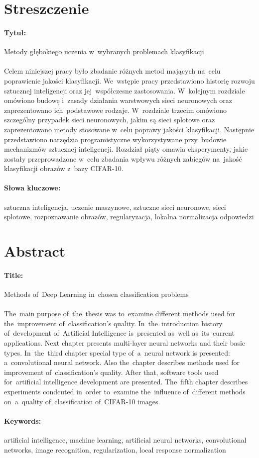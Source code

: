 \newpage
\thispagestyle{empty} %
\section*{Streszczenie}
\paragraph{Tytuł:} Metody głębokiego uczenia w~wybranych problemach klasyfikacji \\\\
Celem niniejszej pracy było zbadanie różnych metod mających na~celu poprawienie jakości klasyfikacji. We~wstępie
pracy przedstawiono historię rozwoju sztucznej inteligencji oraz jej~współczesne zastosowania. W~kolejnym rozdziale
omówiono budowę i~zasady działania warstwowych sieci neuronowych oraz zaprezentowano ich~podstawowe rodzaje.
W~rozdziale trzecim omówiono szczególny przypadek sieci neuronowych, jakim są sieci splotowe oraz zaprezentowano
metody stosowane w~celu poprawy jakości klasyfikacji. Następnie przedstawiono narzędzia programistyczne
wykorzystywane przy~budowie mechanizmów sztucznej inteligencji. Rozdział piąty omawia eksperymenty, jakie zostały
przeprowadzone w~celu zbadania wpływu różnych zabiegów na~jakość klasyfikacji obrazów z~bazy CIFAR-10.

\paragraph{Słowa kluczowe:} sztuczna inteligencja, uczenie maszynowe, sztuczne sieci neuronowe, sieci splotowe,
rozpoznawanie obrazów, regularyzacja, lokalna normalizacja odpowiedzi

\newpage
\thispagestyle{empty} %
\section*{Abstract}
\paragraph{Title:} Methods of~Deep Learning in~chosen classification problems \\\\
The~main purpose of~the~thesis was to~examine different methods used for the~improvement of~classification's quality.
In~the~introduction history of~development of~Artificial Intelligence is~presented as~well as~its~current applications.
Next chapter presents multi-layer neural networks and their basic types. In~the~third chapter special type of~a~neural
network is presented: a~convolutional neural network. Also the~chapter describes methods used for improvement
of~classification's quality. After that, software tools used for~artificial intelligence development are presented.
The~fifth chapter describes experiments condcuted in~order to~examine the~influence of~different methods on~a~quality
of~classification of~CIFAR-10 images.

\paragraph{Keywords:} artificial intelligence, machine learning, artificial neural networks, convolutional networks,
image recognition, regularization, local response normalization